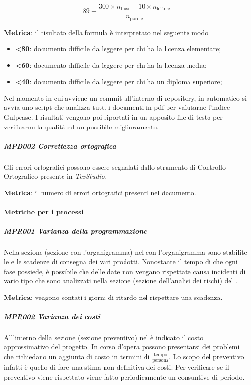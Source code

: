 				\[89+\dfrac{300\times n_{\text{frasi}}-10\times n_{\text{lettere}}}{n_{\text{parole}}}\]

				\textbf{Metrica}: il risultato della formula è interpretato nel seguente modo

				\begin{itemize}
					\item \textbf{<80}: documento  difficile da leggere per chi ha la licenza elementare;
					\item \textbf{<60}: documento  difficile da leggere per chi ha la licenza media;
					\item \textbf{<40}: documento difficile da leggere per chi ha un diploma superiore;
				\end{itemize}

				Nel momento in cui avviene un commit all'interno di repository, in automatico si avvia uno script che analizza tutti i documenti in pdf
				per valutarne l'indice Gulpease. I risultati vengono poi riportati in un apposito file di testo per verificarne la qualità ed un possibile miglioramento.

				\subparagraph{MPD002 Correttezza ortografica}
				Gli errori ortografici possono essere segnalati dallo strumento di Controllo Ortografico presente in \textit{TexStudio}.

				\textbf{Metrica}: il numero di errori ortografici presenti nel documento.

			\paragraph{Metriche per i processi}
				\subparagraph{MPR001 Varianza della programmazione} %
				Nella sezione (sezione con l'organigramma) nel \Doc{\PdP} con l'organigramma sono stabilite le  e le scadenze di consegna dei vari prodotti.
				Nonostante il tempo di  che ogni fase possiede, è possibile che delle date non vengano rispettate causa incidenti di vario tipo che sono
				analizzati nella sezione (sezione dell'analisi dei rischi) del \Doc{\PdP}.

				\textbf{Metrica}: vengono contati i giorni di ritardo nel rispettare una scadenza.

				\subparagraph{MPR002 Varianza dei costi} %
				All'interno della sezione (sezione preventivo) nel \Doc{\PdPv} è indicato il costo approssimativo del progetto.
				In corso d'opera possono presentarsi dei problemi che richiedano un aggiunta di costo in termini di $\frac{\text{tempo}}{\text{persona}}$.
				Lo scopo del preventivo infatti è quello di fare una stima non definitiva dei costi. Per verificare se il preventivo viene
				rispettato viene fatto periodicamente un consuntivo di periodo.


